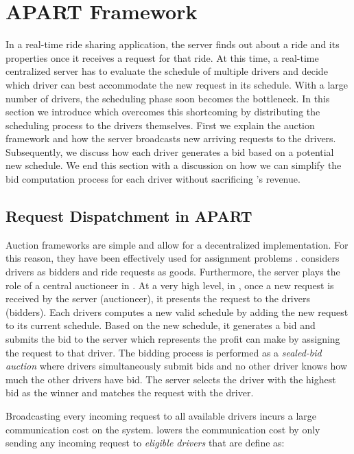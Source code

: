 \section{APART Framework}
\label{sec:framework}

In a real-time ride sharing application, the server finds out about a ride and its properties once it receives a request for that ride. At this time, a real-time centralized server has to evaluate the schedule of multiple drivers and decide which driver can best accommodate the new request in its schedule. With a large number of drivers, the scheduling phase soon becomes the bottleneck. In this section we introduce \fname which overcomes this shortcoming by distributing the scheduling process to the drivers themselves. First we explain the auction framework and how the server broadcasts new arriving requests to the drivers. Subsequently, we discuss how each driver generates a bid based on a potential new schedule. We end this section with a discussion on how we can simplify the bid computation process for each driver without sacrificing \fname 's revenue.

\subsection{Request Dispatchment in APART}
\label{subsec:dispatch}

Auction frameworks are simple and allow for a decentralized implementation. For this reason, they have been effectively used for assignment problems . \fname considers drivers as bidders and ride requests as goods. Furthermore, the server plays the role of a central auctioneer in \fname. At a very high level, in \fname, once a new request is received by the server (auctioneer), it presents the request to the drivers (bidders). Each drivers computes a new valid schedule by adding the new request to its current schedule. Based on the new schedule, it generates a bid and submits the bid to the server which represents the profit \fname can make by assigning the request to that driver. The bidding process is performed as a \textit{sealed-bid auction} where drivers simultaneously submit bids and no other driver knows how much the other drivers have bid. The server selects the driver with the highest bid as the winner and matches the request with the driver.

Broadcasting every incoming request to all available drivers incurs a large communication cost on the system. \fname lowers the communication cost by only sending any incoming request to \textit{eligible drivers} that are define as:

